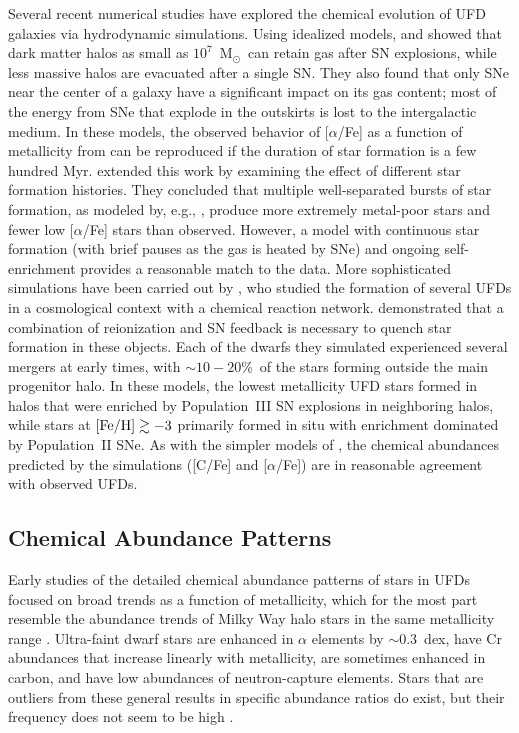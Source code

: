 \documentclass[a4paper]{ar-1col}
\newcommand{\msun}        {M$_{\odot}$}
\newcommand{\feh}         {[Fe/H]}
\begin{document}
Several recent numerical studies have explored the chemical evolution
of UFD galaxies via hydrodynamic simulations.  Using idealized models,
\citet{webster14} and \citet{bh15} showed that dark matter halos as
small as $10^{7}$~\msun\ can retain gas after SN explosions, while
less massive halos are evacuated after a single SN.  They also found
that only SNe near the center of a galaxy have a significant impact on
its gas content; most of the energy from SNe that explode in the
outskirts is lost to the intergalactic medium.  In these models, the
observed behavior of [$\alpha$/Fe] as a function of metallicity from
\citet{vargas13} can be reproduced if the duration of star formation
is a few hundred Myr.  \citet{webster15} extended this work by
examining the effect of different star formation histories.  They
concluded that multiple well-separated bursts of star formation, as
modeled by, e.g., \citet{brown14}, produce more extremely metal-poor
stars and fewer low [$\alpha$/Fe] stars than observed.  However, a
model with continuous star formation (with brief pauses as the gas is
heated by SNe) and ongoing self-enrichment provides a reasonable match
to the data.  More sophisticated simulations have been carried out by
\citet{jeon17}, who studied the formation of several UFDs in a
cosmological context with a chemical reaction network.  \citet{jeon17}
demonstrated that a combination of reionization and SN feedback is
necessary to quench star formation in these objects.  Each of the
dwarfs they simulated experienced several mergers at early times, with
$\sim10-20$\%\ of the stars forming outside the main progenitor halo.
In these models, the lowest metallicity UFD stars formed in halos that
were enriched by Population~III SN explosions in neighboring halos,
while stars at ${\rm \feh} \gtrsim -3$ primarily formed in situ with
enrichment dominated by Population~II SNe.  As with the simpler models
of \citet{webster15}, the chemical abundances predicted by the
\citeauthor{jeon17} simulations ([C/Fe] and [$\alpha$/Fe]) are in
reasonable agreement with observed UFDs.


\subsection{Chemical Abundance Patterns}
\label{sec:abund_patterns}

Early studies of the detailed chemical abundance patterns of stars in
UFDs focused on broad trends as a function of metallicity, which for
the most part resemble the abundance trends of Milky Way halo stars in
the same metallicity range
\citep[e.g.,][]{koch08,frebel10,norris10b,norris10c}.  Ultra-faint
dwarf stars are enhanced in $\alpha$ elements by $\sim0.3$~dex, have
Cr abundances that increase linearly with metallicity, are sometimes
enhanced in carbon, and have low abundances of neutron-capture
elements.  Stars that are outliers from these general results in
specific abundance ratios do exist, but their frequency does not seem
to be high \citep[e.g.,][]{vargas13}.
\end{document}
